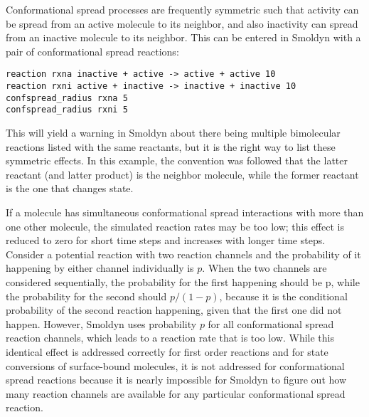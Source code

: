 \documentclass {scrbook}
\begin{document}
Conformational spread processes are frequently symmetric such that activity can be spread from an active molecule to its neighbor, and also inactivity can spread from an inactive molecule to its neighbor. This can be entered in Smoldyn with a pair of conformational spread reactions:
\begin{lstlisting}[style=SSAC]
reaction rxna inactive + active -> active + active 10
reaction rxni active + inactive -> inactive + inactive 10
confspread_radius rxna 5
confspread_radius rxni 5
\end{lstlisting}
This will yield a warning in Smoldyn about there being multiple bimolecular reactions listed with the same reactants, but it is the right way to list these symmetric effects. In this example, the convention was followed that the latter reactant (and latter product) is the neighbor molecule, while the former reactant is the one that changes state.

If a molecule has simultaneous conformational spread interactions with more than one other molecule, the simulated reaction rates may be too low; this effect is reduced to zero for short time steps and increases with longer time steps. Consider a potential reaction with two reaction channels and the probability of it happening by either channel individually is $p$. When the two channels are considered sequentially, the probability for the first happening should be p, while the probability for the second should $p/(1-p)$, because it is the conditional probability of the second reaction happening, given that the first one did not happen. However, Smoldyn uses probability $p$ for all conformational spread reaction channels, which leads to a reaction rate that is too low. While this identical effect is addressed correctly for first order reactions and for state conversions of surface-bound molecules, it is not addressed for conformational spread reactions because it is nearly impossible for Smoldyn to figure out how many reaction channels are available for any particular conformational spread reaction.
\end{document}
